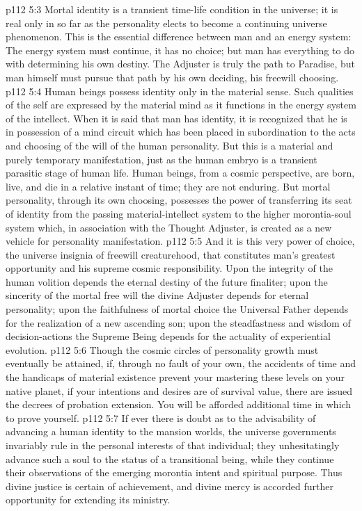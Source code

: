 \vs p112 5:3 \pc Mortal identity is a transient time\hyp{}life condition in the universe; it is real only in so far as the personality elects to become a continuing universe phenomenon. This is the essential difference between man and an energy system: The energy system must continue, it has no choice; but man has everything to do with determining his own destiny. The Adjuster is truly the path to Paradise, but man himself must pursue that path by his own deciding, his freewill choosing.
\vs p112 5:4 Human beings possess identity only in the material sense. Such qualities of the self are expressed by the material mind as it functions in the energy system of the intellect. When it is said that man has identity, it is recognized that he is in possession of a mind circuit which has been placed in subordination to the acts and choosing of the will of the human personality. But this is a material and purely temporary manifestation, just as the human embryo is a transient parasitic stage of human life. Human beings, from a cosmic perspective, are born, live, and die in a relative instant of time; they are not enduring. But mortal personality, through its own choosing, possesses the power of transferring its seat of identity from the passing material\hyp{}intellect system to the higher morontia\hyp{}soul system which, in association with the Thought Adjuster, is created as a new vehicle for personality manifestation.
\vs p112 5:5 And it is this very power of choice, the universe insignia of freewill creaturehood, that constitutes man’s greatest opportunity and his supreme cosmic responsibility. Upon the integrity of the human volition depends the eternal destiny of the future finaliter; upon the sincerity of the mortal free will the divine Adjuster depends for eternal personality; upon the faithfulness of mortal choice the Universal Father depends for the realization of a new ascending son; upon the steadfastness and wisdom of decision\hyp{}actions the Supreme Being depends for the actuality of experiential evolution.
\vs p112 5:6 \pc Though the cosmic circles of personality growth must eventually be attained, if, through no fault of your own, the accidents of time and the handicaps of material existence prevent your mastering these levels on your native planet, if your intentions and desires are of survival value, there are issued the decrees of probation extension. You will be afforded additional time in which to prove yourself.
\vs p112 5:7 If ever there is doubt as to the advisability of advancing a human identity to the mansion worlds, the universe governments invariably rule in the personal interests of that individual; they unhesitatingly advance such a soul to the status of a transitional being, while they continue their observations of the emerging morontia intent and spiritual purpose. Thus divine justice is certain of achievement, and divine mercy is accorded further opportunity for extending its ministry.
